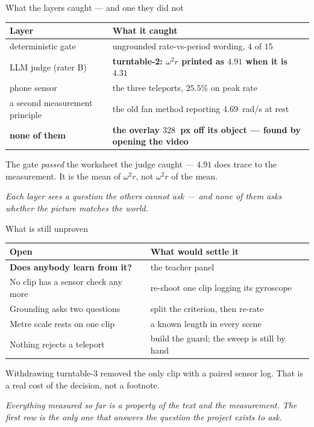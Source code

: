 \documentclass[aspectratio=169,10pt]{beamer}
\newcommand{\takeaway}[1]{\vfill{\footnotesize\itshape\color{cGrey}#1\par}}
\begin{document}
\begin{frame}{What the layers caught --- and one they did not}
\vfill
\begin{center}
\small
\renewcommand{\arraystretch}{1.5}
\begin{tabular}{@{}p{4.2cm}p{6.6cm}@{}}
\toprule
\rowcolor{cInfra!12}
\textbf{Layer} & \textbf{What it caught} \\
\midrule
deterministic gate & ungrounded rate-vs-period wording, $4$ of $15$ \\
LLM judge (rater B) & \textbf{turntable-2: $\omega^2 r$ printed as $4.91$ when it is $4.31$} \\
phone sensor & the three teleports, $25.5\%$ on peak rate \\
a second measurement principle & the old fan method reporting $4.69$~rad/s at rest \\
\addlinespace[2pt]
\rowcolor{cAccent!10}
\textbf{none of them} & \textbf{the overlay $328$~px off its object --- found by opening the video} \\
\bottomrule
\end{tabular}
\end{center}
\vfill
\begin{center}
{\footnotesize The gate \emph{passed} the worksheet the judge caught --- $4.91$ does trace to
the measurement. It is the mean of $\omega^2 r$, not $\omega^2 r$ of the mean.}
\end{center}
\takeaway{Each layer sees a question the others cannot ask --- and none of them asks whether the
picture matches the world.}
\end{frame}

\begin{frame}{What is still unproven}
\vfill
\begin{center}
\small
\renewcommand{\arraystretch}{1.5}
\begin{tabular}{@{}p{5.6cm}p{5.2cm}@{}}
\toprule
\rowcolor{cAccent!10}
\textbf{Open} & \textbf{What would settle it} \\
\midrule
\textbf{Does anybody learn from it?} & the teacher panel \\
No clip has a sensor check any more & re-shoot one clip logging its gyroscope \\
Grounding asks two questions & split the criterion, then re-rate \\
Metre scale rests on one clip & a known length in every scene \\
Nothing rejects a teleport & build the guard; the sweep is still by hand \\
\bottomrule
\end{tabular}
\end{center}
\vfill
\begin{center}
{\footnotesize Withdrawing turntable-3 removed the only clip with a paired sensor log. That is
a real cost of the decision, not a footnote.}
\end{center}
\takeaway{Everything measured so far is a property of the text and the measurement. The first
row is the only one that answers the question the project exists to ask.}
\end{frame}
\end{document}

